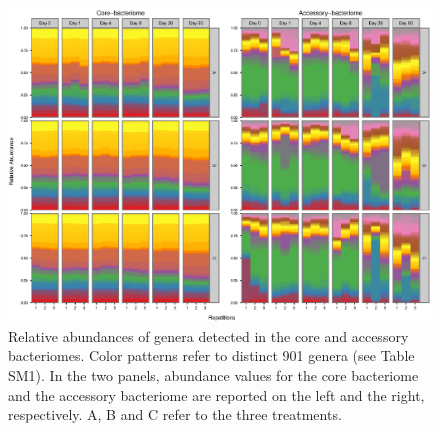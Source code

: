 \begin{figure}[!tb]
	\centering
	\includegraphics[width=1\textwidth]{./figures/Chapter_3/Fig6.eps}
  	\caption{Relative abundances of genera detected in the core and accessory bacteriomes. Color patterns refer to distinct
901 genera (see Table SM1). In the two panels, abundance values for the core bacteriome and the accessory bacteriome are
reported on the left and the right, respectively. A, B and  C refer to the three treatments. \label{fig:6rom}}
\end{figure}

